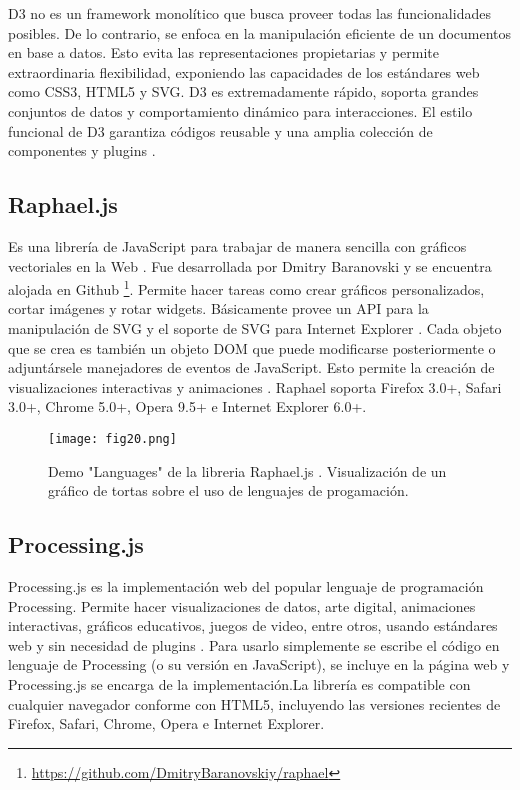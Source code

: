 D3 no es un framework monolítico que busca proveer todas las funcionalidades posibles. De lo contrario, se enfoca en la manipulación eficiente de un documentos en base a datos. Esto evita las representaciones propietarias y permite extraordinaria flexibilidad, exponiendo las capacidades de los estándares web como CSS3, HTML5 y SVG. D3 es extremadamente rápido, soporta grandes conjuntos de datos y comportamiento dinámico para interacciones. El estilo funcional de D3 garantiza códigos reusable y una amplia colección de componentes y plugins \cite{D3JS}.

\subsection{Raphael.js}

Es una librería de JavaScript para trabajar de manera sencilla con gráficos vectoriales en la Web \cite{RaphJS}. Fue desarrollada por Dmitry Baranovski y se encuentra alojada en Github \footnote{\url{https://github.com/DmitryBaranovskiy/raphael}}. Permite hacer tareas como crear gráficos personalizados, cortar imágenes y rotar widgets. Básicamente provee un API para la manipulación de SVG y el soporte de SVG para Internet Explorer \cite{Bar09}. Cada objeto que se crea es también un objeto DOM que puede modificarse posteriormente o adjuntársele manejadores de eventos de JavaScript. Esto permite la creación de visualizaciones interactivas y animaciones . Raphael soporta Firefox 3.0+, Safari 3.0+, Chrome 5.0+, Opera 9.5+ e Internet Explorer 6.0+.

\begin{figure}[htp]
  \centering
  \texttt{[image: fig20.png]}
  \caption[Demo "Languages" de la libreria Raphael.js]{Demo "Languages" de la libreria Raphael.js \cite{RaphJS}. Visualización de un gráfico de tortas sobre el uso de lenguajes de progamación.}
  \label{fig:fig20}
\end{figure}

\subsection{Processing.js}

Processing.js es la implementación web del popular lenguaje de programación Processing. Permite hacer visualizaciones de datos, arte digital, animaciones interactivas, gráficos educativos, juegos de video, entre otros, usando estándares web y sin necesidad de plugins \cite{ProcJS}. Para usarlo simplemente se escribe el código en lenguaje de Processing (o su versión en JavaScript), se incluye en la página web y Processing.js se encarga de la implementación.La librería es compatible con cualquier navegador conforme con HTML5, incluyendo las versiones recientes de Firefox, Safari, Chrome, Opera e Internet Explorer.

